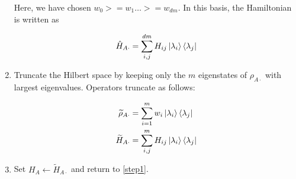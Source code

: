 \begin{enumerate}
  Here, we have chosen $w_0 >= w_1 \ldots >= w_{d m}$. In this basis, the Hamiltonian is written as

  \begin{equation}
    \hat{H}_{A \cdot} = \sum_{i, j}^{d m} H_{ij} \ket{\lambda_i}\bra{\lambda_j}
  \end{equation}

  \item Truncate the Hilbert space by keeping only the $m$ eigenstates of
  $\rho_{A \cdot}$ with largest eigenvalues. Operators truncate as follows:

  \begin{align}
    \widetilde{\rho}_{A \cdot} & = \sum_{i = 1}^{m} w_i \ket{\lambda_i}\bra{\lambda_j} \\
    \widetilde{H}_{A \cdot} & = \sum_{i, j}^{m} H_{ij} \ket{\lambda_i}\bra{\lambda_j}   
  \end{align}

  \item Set $H_{A} \leftarrow \widetilde{H}_{A \cdot}$ and return to \ref{step1}.

\end{enumerate} 







